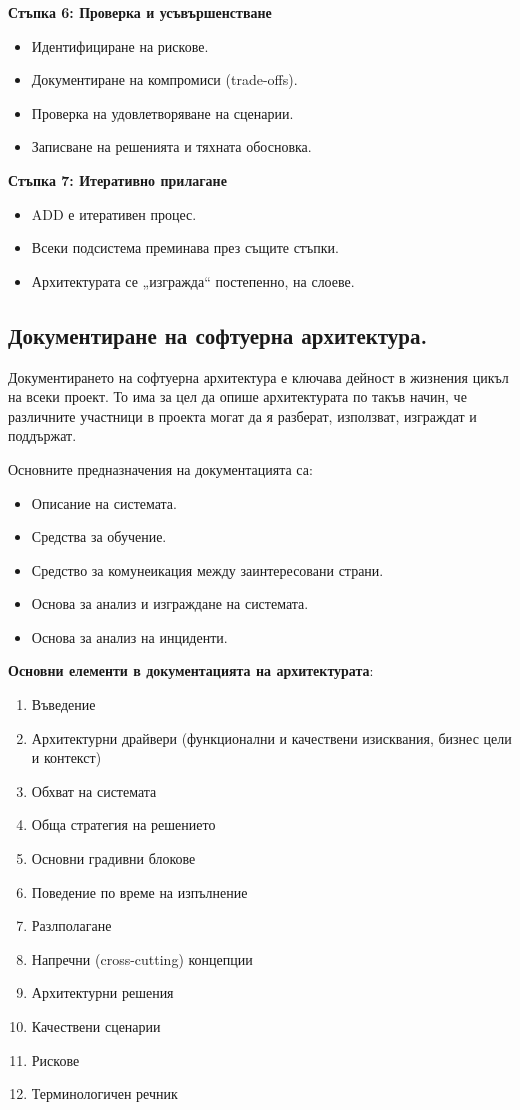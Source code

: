 \documentclass{article}
\renewcommand{\\}{\newline}
\begin{document}
\textbf{Стъпка 6: Проверка и усъвършенстване}

\begin{itemize}
    \item Идентифициране на рискове.
    \item Документиране на компромиси (trade-offs).
    \item Проверка на удовлетворяване на сценарии.
    \item Записване на решенията и тяхната обосновка.
\end{itemize}

\textbf{Стъпка 7: Итеративно прилагане}

\begin{itemize}
    \item ADD е итеративен процес.
    \item Всеки подсистема преминава през същите стъпки.
    \item Архитектурата се „изгражда“ постепенно, на слоеве.
\end{itemize}

\subsection{Документиране на софтуерна архитектура.}

Документирането на софтуерна архитектура е ключава дейност в жизнения цикъл на всеки проект. То има за цел да опише архитектурата по такъв начин, че различните участници в проекта могат да я разберат, използват, изграждат и поддържат.

Основните предназначения на документацията са:
\begin{itemize}
    \item Описание на системата.
    \item Средства за обучение.
    \item Средство за комунеикация между заинтересовани страни.
    \item Основа за анализ и изграждане на системата.
    \item Основа за анализ на инциденти.
\end{itemize}

\textbf{Основни елементи в документацията на архитектурата}:
\begin{enumerate}
    \item Въведение
    \item Архитектурни драйвери (функционални и качествени изисквания, бизнес цели и контекст)
    \item Обхват на системата
    \item Обща стратегия на решението
    \item Основни градивни блокове
    \item Поведение по време на изпълнение
    \item Разлполагане
    \item Напречни (cross-cutting) концепции
    \item Архитектурни решения
    \item Качествени сценарии
    \item Рискове
    \item Терминологичен речник
\end{enumerate}
\newpage
\end{document}
